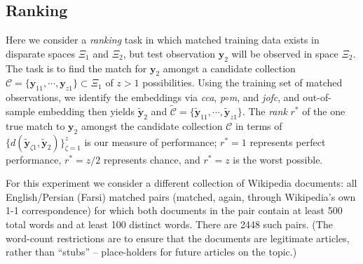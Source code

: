 \documentclass[12pt,xcolor]{article}
\newcommand{\1}{\ensuremath{\mbox{{\bf 1}}}}
\newcommand{\mC}{\mathcal{C}}
\begin{document}
\subsection{Ranking}\label{section:classification}

Here we consider a {\em ranking} task
in which matched training data exists in disparate spaces $\Xi_1$ and $\Xi_2$,
but test observation $\bm{y}_{2}$
will be observed in space $\Xi_{2}$.
The task is to find the match for $\bm{y}_{2}$
amongst a candidate collection $\mC = \{\bm{y}_{11}, \cdots, \bm{y}_{z1}\} \subset \Xi_1$
of $z>1$ possibilities.
Using the training set of matched observations,
we identify the embeddings via {\em cca}, {\it p}$\circ${\it m}, and {\em jofc},
and out-of-sample embedding then yields $\widetilde{\bm{y}}_{2}$
and $\widetilde{\mC} = \{\widetilde{\bm{y}}_{11}, \cdots, \widetilde{\bm{y}}_{z1}\}$.
The {\em rank} $r^*$ of the one true match to $\bm{y}_{2}$
amongst the candidate collection $\mC$
in terms of $\{d(\widetilde{\bm{y}}_{\zeta1},\widetilde{\bm{y}}_{2})\}_{\zeta=1}^z$
is our measure of performance;
$r^* = 1$ represents perfect performance,
$r^* = z/2$ represents chance, and
$r^* = z$ is the worst possible.


For this experiment we consider a different collection of Wikipedia documents:
all English/Persian (Farsi) matched pairs
(matched, again, through Wikipedia's own 1-1 correspondence)
for which both documents in the pair contain
at least 500 total words and at least 100 distinct words.
There are 2448 such pairs.
(The word-count restrictions are to ensure that the documents are legitimate articles,
rather than ``stubs'' -- place-holders for future articles on the topic.)
\end{document}
